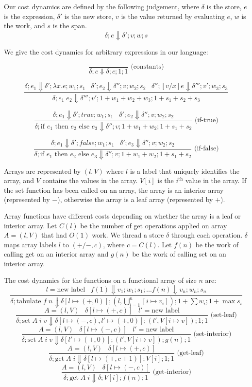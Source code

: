 \documentclass[preprint]{sigplanconf}
\begin{document}
Our cost dynamics are defined by the following judgement, where $\delta$ is the store, $e$ is the expression, $\delta'$ is the new store, $v$ is the value returned by evaluating $e$, $w$ is the work, and $s$ is the span.
$$\delta; e \boldsymbol\Downarrow \delta'; v; w; s$$

We give the cost dynamics for arbitrary expressions in our language:

$$\frac{}{\delta; c \Downarrow \delta; c; 1; 1} \text{ (constants)}$$

$$\frac{\delta; e_1 \Downarrow \delta'; \lambda x . e; w_1 ; s_1 \;\;\; \delta'; e_2 \Downarrow \delta'';v; w_2 ; s_2 \;\;\; \delta''; [v/x]e \Downarrow \delta'''; v'; w_3 ; s_3}{\delta; e_1 \; e_2 \Downarrow \delta'''; v'; 1+w_1+w_2+w_3; 1+s_1+s_2+s_3}$$

$$\frac{\delta; e_1 \Downarrow \delta'; true; w_1; s_1 \;\;\; \delta'; e_2 \Downarrow \delta''; v; w_2; s_2}{\delta; \text{if } e_1 \text{ then } e_2 \text{ else } e_3 \Downarrow \delta''; v; 1+w_1+w_2; 1+s_1+s_2} \text{ (if-true)}$$

$$\frac{\delta; e_1 \Downarrow \delta'; false; w_1; s_1 \;\;\; \delta'; e_3 \Downarrow \delta''; v; w_2; s_2}{\delta; \text{if } e_1 \text{ then } e_2 \text{ else } e_3 \Downarrow \delta''; v; 1+w_1+w_2; 1+s_1+s_2} \text{ (if-false)}$$

Arrays are represented by $(l, V)$ where $l$ is a label that uniquely identifies the array, and $V$ contains the values in the array. $V[i]$ is the $i^{\text{th}}$ value in the array. If the set function has been called on an array, the array is an interior array (represented by $-$), otherwise the array is a leaf array (represented by $+$). 

Array functions have different costs depending on whether the array is a leaf or interior array. Let $C(l)$ be the number of get operations applied on array $A = (l, V)$ that had $O(1)$ work. We thread a store $\delta$ through each operation. $\delta$ maps array labels $l$ to $(+/-, c)$, where $c = C(l)$. Let $f(n)$ be the work of calling get on an interior array and $g(n)$ be the work of calling set on an interior array.

The cost dynamics for the functions on a functional array of size $n$ are:
$$\frac{l = \text{new label} \;\;\; f(1) \Downarrow v_1; w_1; s_1; ... f(n) \Downarrow v_{n}; w_{n}; s_{n}}{\delta; \text{tabulate } f \; n \Downarrow \delta[l \mapsto (+, 0)]; (l, \bigcup_{i=1}^n [i \mapsto v_i]); 1+\sum w_i; 1+\max s_i}$$
$$\frac{A = (l,V) \;\;\; \delta[l \mapsto (+, c)] \;\;\; l' = \text{new label}}{\delta; \text{set} \; A \; i \; v \Downarrow \delta[l \mapsto (-, c), l' \mapsto (+, 0)]; (l', V[i \mapsto v]); 1; 1} \text{  (set-leaf)}$$
$$\frac{A = (l,V) \;\;\; \delta[l \mapsto (-, c)] \;\;\;  l' = \text{new label}}{\delta; \text{set} \; A \; i \; v \Downarrow \delta[l' \mapsto (+, 0)]; (l', V[i \mapsto v]); g(n); 1} \text{  (set-interior)}$$
$$\frac{A = (l,V) \;\;\; \delta[l \mapsto (+, c)]}{\delta; \text{get} \; A \; i \Downarrow \delta[l \mapsto (+, c+1)]; V[i]; 1; 1} \text{  (get-leaf)}$$
$$\frac{A = (l,V) \;\;\; \delta[l \mapsto (-, c)]}{\delta; \text{get} \; A \; i \Downarrow \delta; V[i]; f(n); 1} \text{  (get-interior)}$$
\end{document}
